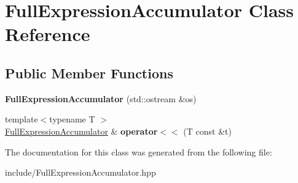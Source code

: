 \hypertarget{class_full_expression_accumulator}{\section{Full\-Expression\-Accumulator Class Reference}
\label{class_full_expression_accumulator}
}
\subsection*{Public Member Functions}
\begin{DoxyCompactItemize}
\item 
\hypertarget{class_full_expression_accumulator_aa787e42e74595b276bcdb7f5787ddf99}{{\bfseries Full\-Expression\-Accumulator} (std\-::ostream \&os)}\label{class_full_expression_accumulator_aa787e42e74595b276bcdb7f5787ddf99}

\item 
\hypertarget{class_full_expression_accumulator_adf47b8e628e412f0364fab4da31cc7db}{{\footnotesize template$<$typename T $>$ }\\\hyperlink{class_full_expression_accumulator}{Full\-Expression\-Accumulator} \& {\bfseries operator$<$$<$} (T const \&t)}\label{class_full_expression_accumulator_adf47b8e628e412f0364fab4da31cc7db}

\end{DoxyCompactItemize}


The documentation for this class was generated from the following file\-:\begin{DoxyCompactItemize}
\item 
include/Full\-Expression\-Accumulator.\-hpp\end{DoxyCompactItemize}
